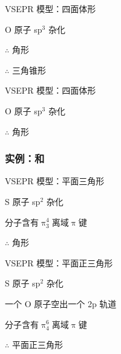             \noindent\begin{minipage}[t]{0.48\textwidth}
                \noindent\textbf{}
                
                VSEPR 模型：四面体形
                
                O 原子 sp$^3$ 杂化
                
                \(\therefore\)  角形
                
                \vspace{\baselineskip}
                
                \noindent\textbf{}
                
                \(\therefore\)  三角锥形
            \end{minipage}
            \hfill
            \begin{minipage}[t]{0.48\textwidth}
                \noindent\textbf{}
                
                VSEPR 模型：四面体形
                
                O 原子 sp$^3$ 杂化
                
                \(\therefore\)  角形
            \end{minipage}

        \subsubsection{实例：\texorpdfstring{}{SO₂}和\texorpdfstring{}{SO₃}}\label{subsubsec:SO2和SO3}

            \noindent\begin{minipage}[t]{0.48\textwidth}
                \noindent\textbf{}
                
                VSEPR 模型：平面三角形
                
                S 原子 sp$^2$ 杂化
                
                 分子含有\(\uppi_3^4\)离域\(\uppi\)键
                
                \(\therefore\)  角形
            \end{minipage}
            \hfill
            \begin{minipage}[t]{0.48\textwidth}
                \noindent\textbf{}
                
                VSEPR 模型：平面正三角形
                
                S 原子 sp$^2$ 杂化
                
                一个 O 原子空出一个 2p 轨道
                
                 分子含有\(\uppi_4^6\)离域\(\uppi\)键
                
                \(\therefore\)  平面正三角形
            \end{minipage}

